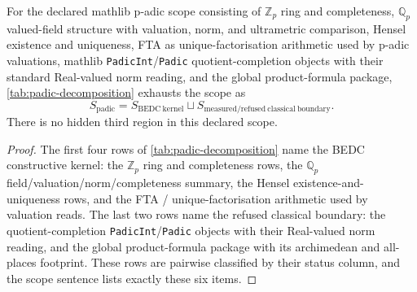 \begin{theorem}
\label{thm:padic-external-scope-boundary-exhaustion}
For the declared mathlib p-adic scope consisting of $\mathbb{Z}_p$ ring and
completeness, $\mathbb{Q}_p$ valued-field structure with valuation, norm, and
ultrametric comparison, Hensel existence and uniqueness, FTA as
unique-factorisation arithmetic used by p-adic valuations, mathlib
\texttt{PadicInt}/\texttt{Padic}
quotient-completion objects with their standard Real-valued norm reading, and
the global product-formula package, \autoref{tab:padic-decomposition}
exhausts the scope as
$$
S_{\mathrm{padic}}
=
S_{\mathrm{BEDC\ kernel}}
\sqcup
S_{\mathrm{measured/refused\ classical\ boundary}}.
$$
There is no hidden third region in this declared scope.
\end{theorem}
\begin{proof}
The first four rows of \autoref{tab:padic-decomposition} name the BEDC
constructive kernel: the $\mathbb{Z}_p$ ring and completeness rows, the
$\mathbb{Q}_p$ field/valuation/norm/completeness summary, the Hensel
existence-and-uniqueness rows, and the FTA / unique-factorisation arithmetic
used by valuation reads. The last two rows name the refused classical boundary: the
quotient-completion \texttt{PadicInt}/\texttt{Padic} objects with their
Real-valued norm reading, and the global product-formula package with its
archimedean and all-places footprint. These rows are pairwise classified by
their status column, and the scope sentence lists exactly these six items.
\end{proof}
